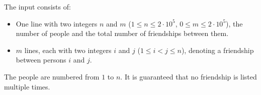 
    The input consists of:
    \begin{itemize}
    \item One line with two integers $n$ and $m$ ($1\leq n\leq 2 \cdot 10^5$, $0\leq m\leq 2 \cdot 10^5$), the number of people and the total number of friendships between them.
    \item $m$ lines, each with two integers $i$ and $j$ ($1\leq i < j\leq n$), denoting a friendship between persons $i$ and $j$.
    \end{itemize}
    The people are numbered from $1$ to $n$. It is guaranteed that no friendship is listed multiple times.
